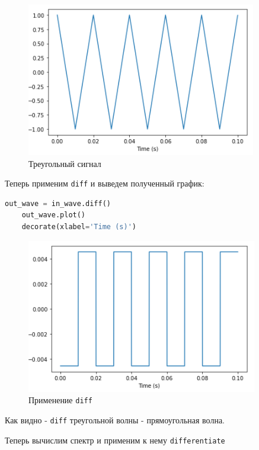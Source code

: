 \documentclass[a4paper]{article}
\begin{document}
            \begin{figure}[H]
                \centering
                \includegraphics{ex_2_1.png}
                \caption{Треугольный сигнал}
                \label{fig:ex_2_1}
            \end{figure}
            
            Теперь применим \texttt{diff} и выведем полученный график:
            
\begin{lstlisting}[language=Python, caption= Применение \texttt{diff}]
    out_wave = in_wave.diff()
    out_wave.plot()
    decorate(xlabel='Time (s)')
\end{lstlisting}
            
            \begin{figure}[H]
                \centering
                \includegraphics{ex_2_2.png}
                \caption{Применение \texttt{diff}}
                \label{fig:ex_2_2}
            \end{figure}
            
            Как видно - \texttt{diff} треугольной волны - прямоугольная волна.
            
            Теперь вычислим спектр и применим к нему \texttt{differentiate}
            
\end{document}
